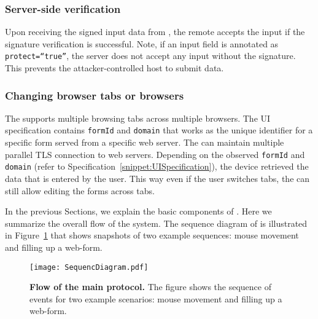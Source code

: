 \subsubsection{\bfseries Server-side verification} \label{sec:systemDesign:commit:verification}Upon receiving the signed input data from \device, the remote accepts the input if the signature verification is successful. Note, if an input field is annotated as \texttt{protect=``true''}, the server does not accept any input without the \device signature. This prevents the attacker-controlled host to submit data. 

\subsubsection{\bfseries Changing browser tabs or browsers}
The \device supports multiple browsing tabs across multiple browsers. The UI specification contains \texttt{formId} and \texttt{domain} that works as the unique identifier for a specific form served from a specific web server. The \device can maintain multiple parallel TLS connection to web servers. Depending on the observed \texttt{formId} and \texttt{domain} (refer to Specification~\ref{snippet:UISpecification}), the device retrieved the data that is entered by the user. This way even if the user switches tabs, the \device can still allow editing the forms across tabs.


 In the previous Sections, we explain the basic components of \name. Here we
summarize the overall flow of the system. The sequence diagram of \name is
illustrated in Figure~\ref{fig:sequence} that shows snapshots of two example
sequences: mouse movement and filling up a web-form.

\iffalse
\begin{figure}[t]
\centering
\texttt{[image: systemDesign.pdf]}
\caption{\textbf{Flow of the \name main protocol.} The figure shows the high-level protocol flow and the main messages that are exchanged between the remote server, host, \device, and the Io devices.}
\spacesave
\label{fig:systemDesign}
\centering
\end{figure}
\fi

\begin{figure}[t]
\centering
\texttt{[image: SequencDiagram.pdf]}
\caption{\textbf{Flow of the \name main protocol.} The figure shows the
sequence of events for two example scenarios: mouse movement and filling up a
web-form.}
\spacesave
\label{fig:sequence}
\centering
\end{figure}



